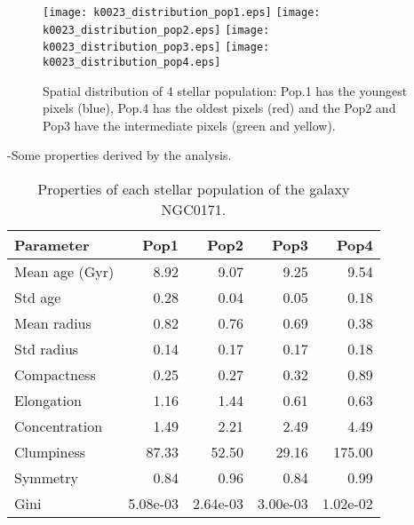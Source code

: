 \begin{figure}[bh]
\begin{center}
\texttt{[image: k0023\_distribution\_pop1.eps]}
\texttt{[image: k0023\_distribution\_pop2.eps]}
\texttt{[image: k0023\_distribution\_pop3.eps]}
\texttt{[image: k0023\_distribution\_pop4.eps]}
 \caption{Spatial distribution of 4 stellar population: Pop.1 has the youngest pixels (blue), Pop.4 has the oldest pixels (red) and the Pop2 and Pop3 have the intermediate pixels (green and yellow).}
   \label{fig1}
\end{center}
\end{figure}


-Some properties derived by the analysis.


\begin{table}[h]
\centering
\begin{tabular}{l|r|r|r|r}
Parameter & Pop1 & Pop2 & Pop3 & Pop4 \\\hline
Mean age (Gyr) & 8.92 & 9.07 & 9.25 & 9.54 \\
Std age & 0.28 & 0.04 & 0.05 & 0.18 \\
Mean radius & 0.82 & 0.76 & 0.69 & 0.38 \\
Std radius & 0.14 & 0.17 & 0.17 & 0.18 \\
Compactness & 0.25 & 0.27 & 0.32 & 0.89 \\
Elongation & 1.16 & 1.44 & 0.61 & 0.63 \\
Concentration & 1.49 & 2.21 & 2.49 & 4.49  \\
Clumpiness & 87.33 & 52.50 & 29.16 & 175.00 \\
Symmetry & 0.84 & 0.96 & 0.84 & 0.99 \\
Gini & 5.08e-03 & 2.64e-03 & 3.00e-03 & 1.02e-02 \\
\end{tabular}
\caption{\label{tab:widgets}Properties of each stellar population of the galaxy NGC0171.}
\end{table}


